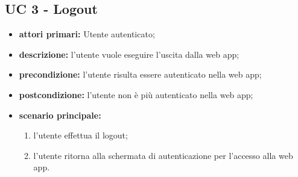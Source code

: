 		\subsection{UC 3 - Logout}
		\begin{itemize}
			\item \textbf{attori primari:} Utente autenticato;
			\item \textbf{descrizione:} l'utente vuole eseguire l'uscita dalla web app;
			\item \textbf{precondizione:} l'utente risulta essere autenticato nella web app;
			\item \textbf{postcondizione:} l'utente non è più autenticato nella web app;
			\item \textbf{scenario principale:}
			\begin{enumerate}
				\item l'utente effettua il logout;
				\item l'utente ritorna alla schermata di autenticazione per l'accesso alla web app.
			\end{enumerate}	
		\end{itemize}


		


		



		


		



		


